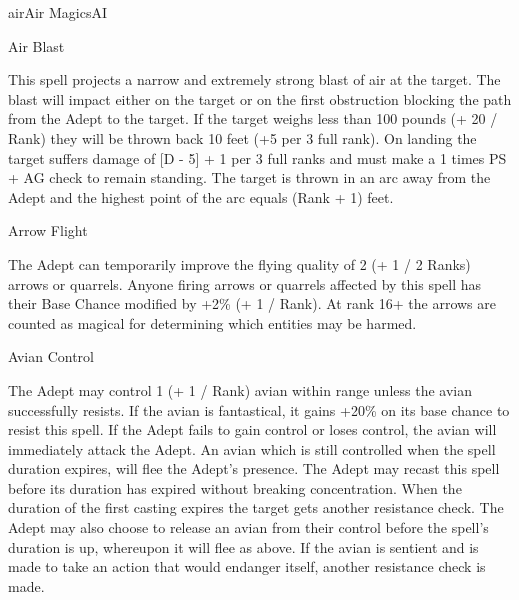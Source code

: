 \begin{college}[2.1]{air}{Air Magics}{AI}
\begin{spell}[S-1]{Air Blast}

\begin{effects}
This spell projects a narrow and extremely strong blast of air at the
target. The blast will impact either on the target or on the first
obstruction blocking the path from the Adept to the target. If the
target weighs less than 100 pounds (+ 20 / Rank) they will be thrown
back 10 feet (+5 per 3 full rank). On landing the target suffers
damage of [D - 5] + 1 per 3 full ranks and must make a 1 times PS + AG
check to remain standing. The target is thrown in an arc away from the
Adept and the highest point of the arc equals (Rank + 1) feet.
\end{effects}
\end{spell}

\begin{spell}[S-2]{Arrow Flight}

\begin{effects}
The Adept can temporarily improve the flying quality of 2 (+ 1 / 2 Ranks)
arrows or quarrels. Anyone firing arrows or quarrels affected by this
spell has their Base Chance modified by +2\% (+ 1 / Rank). At rank 16+
the arrows are counted as magical for determining which entities may
be harmed.
\end{effects}
\end{spell}

\begin{spell}[S-3]{Avian Control}

\begin{effects}
The Adept may control 1 (+ 1 / Rank) avian within range unless the
avian successfully resists. If the avian is fantastical, it gains
+20\% on its base chance to resist this spell. If the Adept fails to
gain control or loses control, the avian will immediately attack the
Adept. An avian which is still controlled when the spell duration
expires, will flee the Adept's presence. The Adept may recast this
spell before its duration has expired without breaking concentration.
When the duration of the first casting expires the target gets another
resistance check. The Adept may also choose to release an avian from
their control before the spell's duration is up, whereupon it will
flee as above. If the avian is sentient and is made to take an action
that would endanger itself, another resistance check is made.
\end{effects}
\end{spell}


\end{college}
